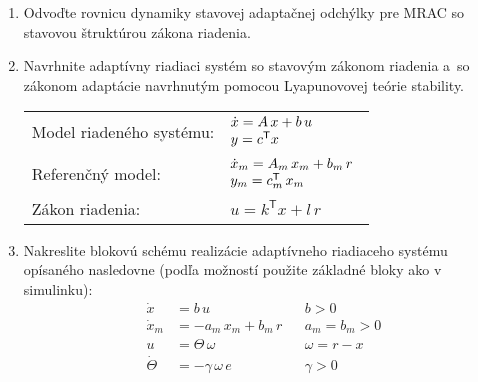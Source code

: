 \documentclass[a4paper, 10pt, ]{article}
\begin{document}
\begin{enumerate}[leftmargin=0pt, labelsep=4mm, itemsep=0pt]
    \item Odvoďte rovnicu dynamiky stavovej adaptačnej odchýlky pre MRAC so stavovou štruktúrou zákona riadenia.


    \item Navrhnite adaptívny riadiaci systém so stavovým zákonom riadenia a~so zákonom adaptácie navrhnutým pomocou Lyapunovovej teórie stability.

    	\begin{tabular}{@{}l l}
    	Model riadeného systému: & $\begin{array}{@{}l} \dot{x} = A\,x+ b\,u\\   y = c^\mathsf{T}x \end{array}$ \vspace{1.5mm}\\
    	Referenčný model: & $\begin{array}{@{}l} \dot{x}_m = A_m\,x_m + b_m\,r\\   y_m = c^\mathsf{T}_m\,x_m \end{array}$ \vspace{2.5mm} \\
    	Zákon riadenia: & $u = k^\mathsf{T} x + l\,r$
    	\end{tabular}



        \item Nakreslite blokovú schému realizácie adaptívneho riadiaceho systému opísaného nasledovne (podľa možností použite základné bloky ako v simulinku):
        \begin{align*}
            \dot{x} &= b\,u & &b>0 \\
            \dot{x}_m &= -a_m\,x_m + b_m\,r & &a_m = b_m > 0 \\
            u &= \Theta \, \omega & & \omega = r - x \\
            \dot{\Theta} &= - \gamma\,\omega\,e & &\gamma > 0
        \end{align*}




\end{enumerate}
\end{document}
